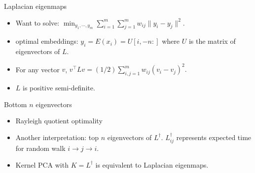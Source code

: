 \documentclass[final]{beamer}
\begin{document}
\begin{frame}{Laplacian eigenmaps}
	\begin{itemize}
		\item Want to solve: $\min_{y_1,\cdots,y_m} \sum_{i=1}^m \sum_{j=1}^m w_{ij} \|y_i - y_j\|^2.$
		\pause
		\item optimal embeddings: $y_i = E(x_i) = U[i,-n:]$ where $U$ is the matrix of eigenvectors of $L$.
		\pause
		\item For any vector $v$, $v^\top L v = (1/2)\sum_{i, j=1}^m w_{ij} (v_i - v_j)^2.$
		\pause
		\item $L$ is positive semi-definite.
	\end{itemize}
\end{frame}
\begin{frame}{Bottom $n$ eigenvectors}
	\begin{itemize}
		\item Rayleigh quotient optimality
		\pause
		\item Another interpretation: top $n$ eigenvectors of $L^\dagger.$ $L^\dagger_{ij}$ represents expected time for random walk $i \to j \to i.$ 
		\pause
		\item Kernel PCA with $K = L^\dagger$ is equivalent to Laplacian eigenmaps. 
	\end{itemize}
\end{frame}
\begin{comment}
\begin{frame}{Combining dimension reduction and k-means}
	\begin{itemize}
		\item Spectral clustering algorithm uses Laplacian eigenmaps on $m$-dimensional data.
		\pause
		\item Uses $v_i, i = 1,2,\cdots,m$ eigenvectors of $L$ corresponding to the $k$ smallest eigenvalues.
		\pause
		\item Perform k-means on 
	\end{itemize}
\end{frame}
\end{comment}
\end{document}
